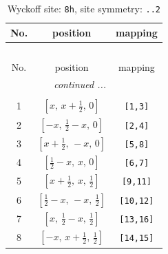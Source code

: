 \documentclass[fleqn,8pt]{jsarticle}
\begin{document}
\begin{longtable}{ccc}
\caption{Wyckoff site: {\tt 8h}, site symmetry: {\tt ..2}}
 \\
 \hline \hline
No. & position & mapping \\ \hline \endfirsthead

\multicolumn{2}{l}{\tablename\ \thetable{}} \\
 \hline \hline
No. & position & mapping \\ \hline \endhead

 \hline \hline
\multicolumn{2}{r}{\footnotesize\it continued ...} \\ \endfoot

 \hline \hline
\multicolumn{2}{r}{} \\ \endlastfoot

1 & $\left[ x,\, x + \frac{1}{2},\, 0 \right]$ & {\tt [1,3]} \\ \hline
2 & $\left[ - x,\, \frac{1}{2} - x,\, 0 \right]$ & {\tt [2,4]} \\ \hline
3 & $\left[ x + \frac{1}{2},\, - x,\, 0 \right]$ & {\tt [5,8]} \\ \hline
4 & $\left[ \frac{1}{2} - x,\, x,\, 0 \right]$ & {\tt [6,7]} \\ \hline
5 & $\left[ x + \frac{1}{2},\, x,\, \frac{1}{2} \right]$ & {\tt [9,11]} \\ \hline
6 & $\left[ \frac{1}{2} - x,\, - x,\, \frac{1}{2} \right]$ & {\tt [10,12]} \\ \hline
7 & $\left[ x,\, \frac{1}{2} - x,\, \frac{1}{2} \right]$ & {\tt [13,16]} \\ \hline
8 & $\left[ - x,\, x + \frac{1}{2},\, \frac{1}{2} \right]$ & {\tt [14,15]} \\
\end{longtable}
\renewcommand{\arraystretch}{1.2}
\end{document}
